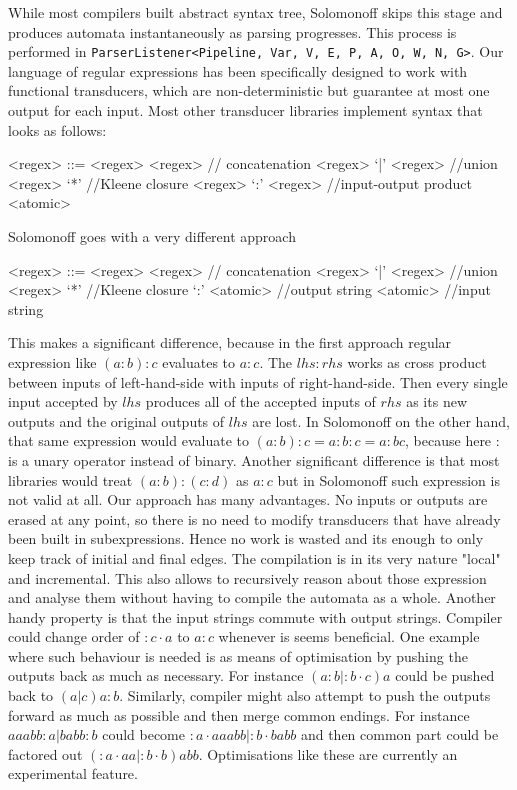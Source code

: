 \documentclass[12pt]{article}
\begin{document}
While most compilers built abstract syntax tree, Solomonoff skips this stage and produces automata instantaneously as parsing progresses. This process is performed in \texttt{ParserListener<Pipeline, Var, V, E, P, A, O, W, N, G>}. Our language of regular expressions has been specifically designed to work with functional transducers, which are non-deterministic but guarantee at most one output for each input. Most other transducer libraries implement syntax that looks as follows:
\begin{grammar}
	
	<regex> ::= <regex>  <regex> // concatenation
	\alt <regex> `|' <regex> //union
	\alt <regex> `*'              //Kleene closure
	\alt <regex> `:' <regex> //input-output product
	\alt <atomic> 
	
\end{grammar}
Solomonoff goes with a very different approach
\begin{grammar}
	
	<regex> ::= <regex>  <regex> // concatenation
	\alt <regex> `|' <regex> //union
	\alt <regex> `*'              //Kleene closure
	\alt `:' <atomic> //output string
	\alt <atomic> //input string
	
\end{grammar}
This makes a significant difference, because in the first approach regular expression like $(a:b):c$ evaluates to $a:c$. The $lhs:rhs$ works as cross product between inputs of left-hand-side with inputs of right-hand-side. Then every single input accepted by $lhs$ produces all of the accepted inputs of $rhs$ as its new outputs and the original outputs of $lhs$ are lost. In Solomonoff on the other hand, that same expression would evaluate to $(a: b) : c=a: b : c=a: bc$, because here $:$ is a unary operator instead of binary. Another significant difference is that most libraries would treat $(a: b):(c: d)$ as $a:c$ but in Solomonoff such expression is not valid at all. Our approach has many advantages. No inputs or outputs are erased at any point, so there is no need to modify transducers that have already been built in subexpressions. Hence no work is wasted and its enough to only keep track of initial and final edges. The compilation is in its very nature "local" and incremental. This also allows to recursively reason about those expression and analyse them without having to compile the automata as a whole.  Another handy property is that the input strings commute with output strings. Compiler could change order of $:c \cdot a$ to $a:c$ whenever is seems beneficial. One example where such behaviour is needed is as means of optimisation by pushing the outputs back as much as necessary. For instance $(a:b|:b \cdot c)a$ could be pushed back to $(a|c)a:b$. Similarly, compiler might also attempt to push the outputs forward as much as possible and then merge common endings. For instance $aaabb:a|babb:b$ could become
$:a \cdot aaabb|:b \cdot babb$ and then common part could be factored out $(:a \cdot aa|:b \cdot b)abb$. Optimisations like these are currently an experimental feature.
\end{document}

